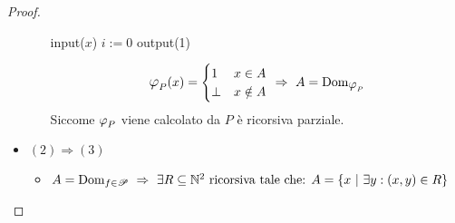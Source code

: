 \begin{proof}
\begin{itemize}
\begin{itemize}
            \begin{minipage}{.32\textwidth}
                \begin{tcolorbox}[
                    colback=white,
                    sharp corners,
                    boxrule=.3mm,
                    left=20pt,
                    top=0pt,
                    bottom=0pt,
                    title=$P$,
                    colbacktitle=white,
                    coltitle=black
                ]
                \begin{algorithm}[H]
                    \SetAlgoNoEnd
                    input($x$)\;
                    $i:=0$\;
                    output(1)\;
                \end{algorithm}
                \end{tcolorbox}
            \end{minipage}\hspace{1em}
            \begin{minipage}{.50\textwidth}
                $$ \semRAM_P(x) = \begin{cases}
                    1 & x\in A\\
                    \perp & x\notin A
                \end{cases}\ \Rightarrow \ A=\text{Dom}_{\semRAM_P} $$
                Siccome $\semRAM_P$ viene calcolato da $P$ è ricorsiva parziale.
            \end{minipage}\vspace{1em}
        \end{itemize}
        \item $(2)\Rightarrow(3)$
        \begin{itemize}
            \item[] $A=\text{Dom}_{f\in\ricPar}\ \Rightarrow \ \exists R\subseteq\N^2
            \text{ ricorsiva tale che: }A=\{ x\ |\ \exists y:(x,y)\in R\}$


\end{itemize}
\end{itemize}
\end{proof}
